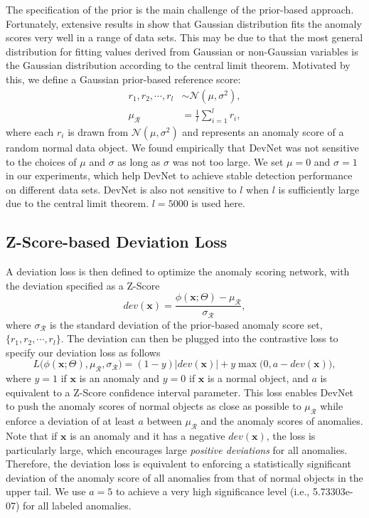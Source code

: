 \documentclass[sigconf]{acmart}
\begin{document}
The specification of the prior is the main challenge of the prior-based approach. Fortunately, extensive results in \cite{kriegel2011interpreting} show that Gaussian distribution fits the anomaly scores very well in a range of data sets. This may be due to that the most general distribution for fitting values derived from Gaussian or non-Gaussian variables is the Gaussian distribution according to the central limit theorem. Motivated by this, we define a Gaussian prior-based reference score:
\begin{align}
    r_1, r_2, \cdots, r_l & \sim \mathcal{N}(\mu, \sigma^{2}), \\
    \mu_{\mathcal{R}} & = \frac{1}{l}\sum_{i=1}^{l}r_i,
\end{align}
where each $r_i$ is drawn from $\mathcal{N}(\mu, \sigma^{2})$ and represents an anomaly score of a random normal data object. We found empirically that DevNet was not sensitive to the choices of $\mu$ and $\sigma$ as long as $\sigma$ was not too large. We set $\mu=0$ and $\sigma=1$ in our experiments, which help DevNet to achieve stable detection performance on different data sets. DevNet is also not sensitive to $l$ when $l$ is sufficiently large due to the central limit theorem. $l=5000$ is used here. 


\subsection{Z-Score-based Deviation Loss}\label{sec:loss}

A deviation loss is then defined to optimize the anomaly scoring network, with the deviation specified as a Z-Score
\begin{equation}
    \mathit{dev}(\mathbf{x}) = \frac{\phi(\mathbf{x};\Theta) - \mu_{\mathcal{R}}}{\sigma_{\mathcal{R}}},
\end{equation}
where $\sigma_{\mathcal{R}}$ is the standard deviation of the prior-based anomaly score set, $\{r_1, r_2, \cdots, r_l\}$. The deviation can then be plugged into the contrastive loss \cite{hadsell2006contrastloss} to specify our deviation loss as follows
\begin{equation}\label{eqn:loss}
    L\big( \phi(\mathbf{x};\Theta), \mu_{\mathcal{R}}, \sigma_{\mathcal{R}} \big) = (1-y)|\mathit{dev}(\mathbf{x})| + y \max\big(0, a - \mathit{dev}(\mathbf{x})\big),
\end{equation}
where $y=1$ if $\mathbf{x}$ is an anomaly and $y=0$ if $\mathbf{x}$ is a normal object, and $a$ is equivalent to a Z-Score confidence interval parameter. This loss enables DevNet to push the anomaly scores of normal objects as close as possible to $\mu_{\mathcal{R}}$ while enforce a deviation of at least $a$ between $\mu_{\mathcal{R}}$ and the anomaly scores of anomalies. Note that if $\mathbf{x}$ is an anomaly and it has a negative $\mathit{dev}(\mathbf{x})$, the loss is particularly large, which encourages large \textit{positive deviations} for all anomalies. Therefore, the deviation loss is equivalent to enforcing a statistically significant deviation of the anomaly score of all anomalies from that of normal objects in the upper tail. We use $a=5$ to achieve a very high significance level (i.e., 5.73303e-07) for all labeled anomalies. 
\end{document}
